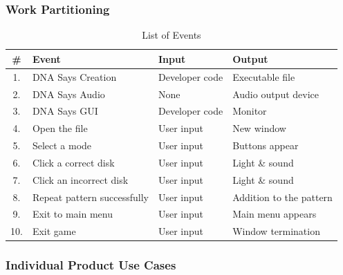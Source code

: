 \documentclass[12pt, titlepage]{article}
\begin{document}
\newpage
\subsubsection{Work Partitioning}

\begin{table}[h]
	\centering
	\caption{List of Events}
	\label{tab:table2}
	\begin{tabular}{clll}
		\hline
		\# & Event & Input & Output\\
		\hline
		1. & DNA Says Creation & Developer code & Executable file\\
		2. & DNA Says Audio & None & Audio output device\\
		3. & DNA Says GUI & Developer code & Monitor\\
		4. & Open the file & User input & New window\\
		5. & Select a mode & User input & Buttons appear\\
		6. & Click a correct disk & User input & Light \& sound\\
		7. & Click an incorrect disk & User input & Light \& sound\\
		8. & Repeat pattern successfully & User input & Addition to the pattern\\
		9. & Exit to main menu & User input & Main menu appears\\
		10. & Exit game & User input & Window termination\\
		\hline
	\end{tabular}
\end{table}


\subsubsection{Individual Product Use Cases}
\end{document}
